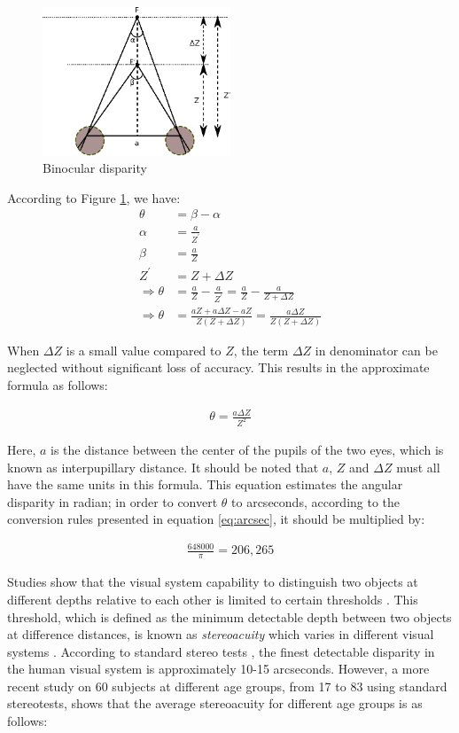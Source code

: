 \begin{figure}[!h]
\centering
\includegraphics[width=0.5\textwidth]{binocular}
\caption{Binocular disparity}
\label{fig:stereopsis}
\end{figure} 

According to Figure \ref{fig:stereopsis}, we have:
\begin{align}
\theta &= \beta - \alpha\\
\alpha &= \frac{a}{Z^{'}}\\
\beta &= \frac{a}{Z}\\
Z^{'} &= Z + \Delta Z\\
\Rightarrow \theta &= \frac{a}{Z} - \frac{a}{Z^{'}}= \frac{a}{Z} - \frac{a}{Z+\Delta Z} \\
\Rightarrow \theta &= \frac{aZ+a\Delta Z-aZ}{Z(Z+\Delta Z)} = \frac{a \Delta Z}{Z(Z+ \Delta Z)}
\end{align}

When $\Delta Z$ is a small value compared to $Z$, the term $\Delta Z$ in denominator can be neglected without 
significant loss of accuracy. This results in
the approximate formula as follows:

\begin{align}
\label{eq:stac}
\theta = \frac{a \Delta Z}{Z^{2}}
\end{align}

Here, $a$ is the distance between the center of the pupils of the two eyes, which is known as interpupillary distance.
It should be noted that $a$, $Z$ and $ \Delta Z$ must all have the same units in this formula. 
This equation estimates the angular disparity in radian; in order to convert $\theta$ to arcseconds, 
according to the conversion rules presented in equation \ref{eq:arcsec}, it should be multiplied by:

\begin{align}
\frac {648000} {\pi} = 206,265
\end{align}

Studies show that the visual system capability to distinguish two objects at different depths relative to each other is limited to certain thresholds \cite{binr83,how95}.
This threshold, which is defined as the minimum detectable depth between two 
objects at difference distances, is known as {\it stereoacuity} which varies in different visual systems \cite{binr83,how95}. According to standard
stereo tests \cite{binr83}, the finest detectable disparity in the human visual system is approximately 10-15 arcseconds.
However, a more recent study on 60 subjects \cite{garn06} at different age groups, from 17 to 83 using standard stereotests, 
shows that the average stereoacuity for different age groups is as follows: \newline

